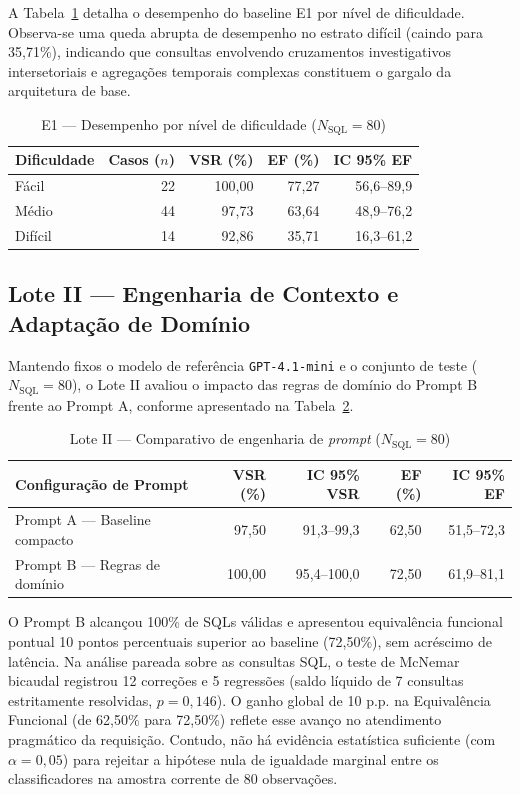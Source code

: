 \documentclass[12pt]{article}
\begin{document}
A Tabela~\ref{tab:diff} detalha o desempenho do baseline E1 por nível de dificuldade. Observa-se uma queda abrupta de desempenho no estrato difícil (caindo para 35,71\%), indicando que consultas envolvendo cruzamentos investigativos intersetoriais e agregações temporais complexas constituem o gargalo da arquitetura de base.

\begin{table}[htbp]
\centering
\caption{E1 --- Desempenho por nível de dificuldade ($N_{\text{SQL}} = 80$)}
\label{tab:diff}
\small
\begin{tabular}{lrrrr}
\toprule
\textbf{Dificuldade} & \textbf{Casos ($n$)} & \textbf{VSR (\%)} & \textbf{EF (\%)} & \textbf{IC 95\% EF} \\
\midrule
Fácil & 22 & 100,00 & 77,27 & 56,6--89,9 \\
Médio & 44 & 97,73 & 63,64 & 48,9--76,2 \\
Difícil & 14 & 92,86 & 35,71 & 16,3--61,2 \\
\bottomrule
\end{tabular}
\end{table}

\subsection{Lote II --- Engenharia de Contexto e Adaptação de Domínio}

Mantendo fixos o modelo de referência \texttt{GPT-4.1-mini} e o conjunto de teste ($N_{\text{SQL}} = 80$), o Lote II avaliou o impacto das regras de domínio do Prompt B frente ao Prompt A, conforme apresentado na Tabela~\ref{tab:lote2}.

\begin{table}[htbp]
\centering
\caption{Lote II --- Comparativo de engenharia de \textit{prompt} ($N_{\text{SQL}} = 80$)}
\label{tab:lote2}
\small
\begin{tabular}{lrrrr}
\toprule
\textbf{Configuração de Prompt} & \textbf{VSR (\%)} & \textbf{IC 95\% VSR} & \textbf{EF (\%)} & \textbf{IC 95\% EF} \\
\midrule
Prompt A --- Baseline compacto & 97,50 & 91,3--99,3 & 62,50 & 51,5--72,3 \\
Prompt B --- Regras de domínio & 100,00 & 95,4--100,0 & 72,50 & 61,9--81,1 \\
\bottomrule
\end{tabular}
\end{table}

O Prompt B alcançou 100\% de SQLs válidas e apresentou equivalência funcional pontual 10 pontos percentuais superior ao baseline (72,50\%), sem acréscimo de latência. Na análise pareada sobre as consultas SQL, o teste de McNemar bicaudal registrou 12 correções e 5 regressões (saldo líquido de 7 consultas estritamente resolvidas, $p = 0{,}146$). O ganho global de 10 p.p. na Equivalência Funcional (de 62,50\% para 72,50\%) reflete esse avanço no atendimento pragmático da requisição. Contudo, não há evidência estatística suficiente (com~$\alpha = 0{,}05$) para rejeitar a hipótese nula de igualdade marginal entre os classificadores na amostra corrente de 80 observações.
\end{document}
